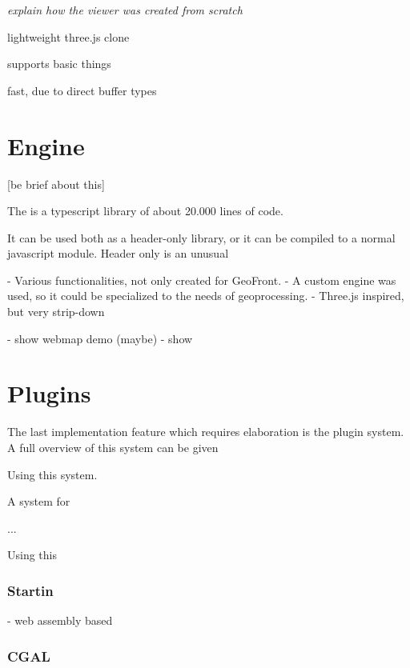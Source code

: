 \emph{explain how the viewer was created from scratch}

lightweight three.js clone

supports basic things

fast, due to direct buffer types





\section{Engine}
[be brief about this]

The  is a typescript library of about 20.000 lines of code. 

It can be used both as a header-only library, or it can be compiled to a normal javascript module. 
Header only is an unusual 

- Various functionalities, not only created for GeoFront.
- A custom engine was used, so it could be specialized to the needs of geoprocessing. 
- Three.js inspired, but very strip-down

- show webmap demo (maybe)
- show 

\section{Plugins}
The last implementation feature which requires elaboration is the plugin system. 
A full overview of this system can be given 





Using this system. 



A system for 

...

Using this 


\subsubsection{ Startin }
- web assembly based

\subsubsection{ CGAL }





